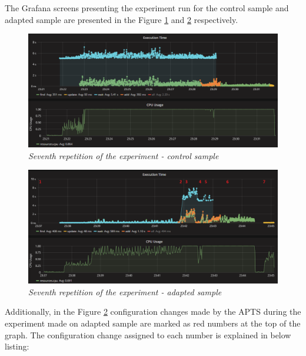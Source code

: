 \documentclass[12pt,a4paper]{article}
\begin{document}
The Grafana screens presenting the experiment run for the control sample and adapted sample are presented in the Figure \ref{figure:random:screen:control:7} and \ref{figure:random:screen:adapted:7} respectively. 

\begin{figure}[!htb]
\centering
\includegraphics[width=1\textwidth]{7-ctrl}
\caption{\textit{Seventh repetition of the experiment - control sample}} \label{figure:random:screen:control:7}
\end{figure}

\begin{figure}[!htb]
\centering
\includegraphics[width=1\textwidth]{7-adap}
\caption{\textit{Seventh repetition of the experiment - adapted sample}} \label{figure:random:screen:adapted:7}
\end{figure}


Additionally, in the Figure \ref{figure:random:screen:adapted:7} configuration changes made by the APTS during the experiment made on adapted sample are marked as red numbers at the top of the graph. The configuration change assigned to each number is explained in below listing: 
\end{document}
